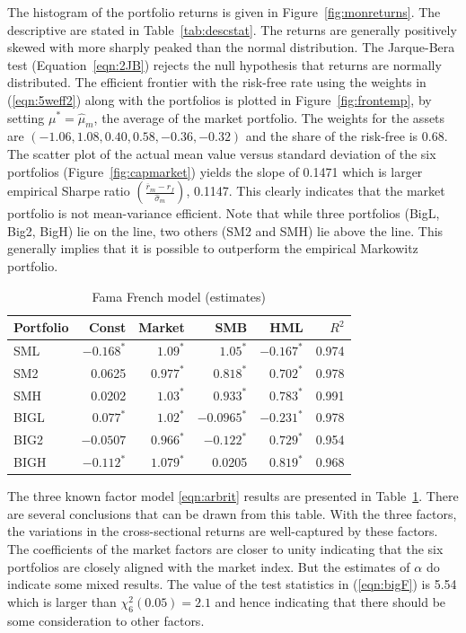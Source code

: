 The histogram of the portfolio returns is given in Figure~\ref{fig:monreturns}. The descriptive are stated in Table~\ref{tab:descstat}. The returns are generally positively skewed with more sharply peaked than the normal distribution. The Jarque-Bera test (Equation~\ref{eqn:2JB}) rejects the null hypothesis that returns are normally distributed. The efficient frontier with the risk-free rate using the weights in (\ref{eqn:5weff2}) along with the portfolios is plotted in Figure~\ref{fig:frontemp}, by setting $\mu^*=\hat{\mu}_m$, the average of the market portfolio. The weights for the assets are $(-1.06,1.08,0.40,0.58,-0.36,-0.32)$ and the share of the risk-free is 0.68. The scatter plot of the actual mean value versus standard deviation of the six portfolios (Figure~\ref{fig:capmarket}) yields the slope of 0.1471 which is larger empirical Sharpe ratio $\left(\frac{\overline{r}_m - r_f}{\hat{\sigma}_m}\right)$, 0.1147. This clearly indicates that the market portfolio is not mean-variance efficient. Note that while three portfolios (BigL, Big2, BigH) lie on the line, two others (SM2 and SMH) lie above the line. This generally implies that it is possible to outperform the empirical Markowitz portfolio. 


\begin{table}
\centering
\caption{Fama French model (estimates)\label{tab:famafrenchmodel}}
\begin{tabular}{lrrrrr}
Portfolio & Const & Market & SMB & HML & $R^2$ \\ \hline
SML & $-0.168^*$ & $1.09^*$ & $1.05^*$ & $-0.167^*$ & 0.974 \\
SM2 & 0.0625 & $0.977^*$ & $0.818^*$ & $0.702^*$ & 0.978 \\
SMH & 0.0202 & $1.03^*$ & $0.933^*$ & $0.783^*$ & 0.991 \\
BIGL & $0.077^*$ & $1.02^*$ & $-0.0965^*$ & $-0.231^*$ & 0.978 \\
BIG2 & $-0.0507$ & $0.966^*$ & $-0.122^*$ & $0.729^*$ & 0.954 \\
BIGH & $-0.112^*$ & $1.079^*$ & 0.0205 & $0.819^*$ & 0.968
\end{tabular}
\end{table}


The three known factor model \eqref{eqn:arbrit} results are presented in Table~\ref{tab:famafrenchmodel}. There are several conclusions that can be drawn from this table. With the three factors, the variations in the cross-sectional returns are well-captured by these factors. The coefficients of the market factors are closer to unity indicating that the six portfolios are closely aligned with the market index. But the estimates of $\alpha$ do indicate some mixed results. The value of the test statistics in (\ref{eqn:bigF}) is 5.54 which is larger than $\chi_6^2(0.05)=2.1$ and hence indicating that there should be some consideration to other factors.


